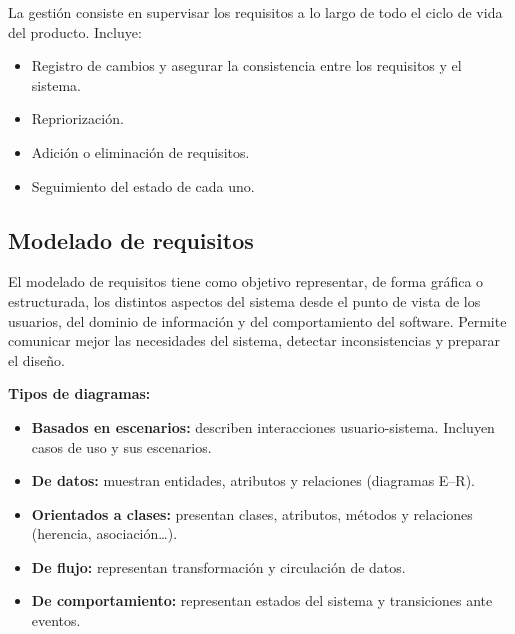    La gestión consiste en supervisar los requisitos a lo largo de todo el ciclo de vida del producto.
    Incluye:


    \begin{itemize}

        \item Registro de cambios y asegurar la consistencia entre los requisitos y el sistema.

        \item Repriorización.

        \item Adición o eliminación de requisitos.

        \item Seguimiento del estado de cada uno.

    \end{itemize}

    \subsection{Modelado de requisitos}\label{subsec:modelado-de-requisitos}


    El modelado de requisitos tiene como objetivo representar, de forma gráfica o estructurada, los distintos aspectos del sistema desde el punto de vista de los usuarios, del dominio de información y del comportamiento del software.
    Permite comunicar mejor las necesidades del sistema, detectar inconsistencias y preparar el diseño.


    \textbf{Tipos de diagramas:}

    \begin{itemize}

        \item \textbf{Basados en escenarios:} describen interacciones usuario-sistema.
        Incluyen casos de uso y sus escenarios.

        \item \textbf{De datos:} muestran entidades, atributos y relaciones (diagramas E–R).

        \item \textbf{Orientados a clases:} presentan clases, atributos, métodos y relaciones (herencia, asociación\ldots).

        \item \textbf{De flujo:} representan transformación y circulación de datos.

        \item \textbf{De comportamiento:} representan estados del sistema y transiciones ante eventos.

    \end{itemize}


